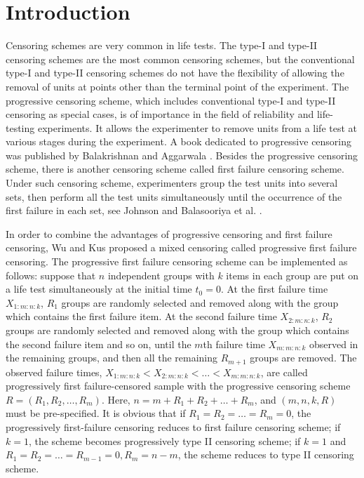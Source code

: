 \documentclass[12pt]{article}
\begin{document}
\section{Introduction}
Censoring schemes are very common in life tests. The type-I and type-II censoring schemes are the most common censoring schemes, but the conventional type-I and type-II censoring schemes do not have the flexibility of allowing the removal of units at points other than the terminal point of the experiment. The progressive censoring scheme, which includes conventional type-I and type-II censoring as special cases, is of importance in the field of reliability and life-testing experiments. It allows the experimenter to remove units from a life test at various stages during the experiment. A book dedicated to progressive censoring was published by Balakrishnan and Aggarwala \cite{balakrishnan2000progressive}. Besides the progressive censoring scheme, there is another censoring scheme called first failure censoring scheme. Under such censoring scheme, experimenters group the test units into several sets, then perform all the test units simultaneously until the occurrence of the first failure in each set, see Johnson \cite{ johnson1964theory} and Balasooriya et al. \cite{ balasooriya2000progressively}.

In order to combine the advantages of progressive censoring and first failure censoring, Wu and Kus \cite{wu2009estimation} proposed a mixed censoring called progressive first failure censoring. The progressive first failure censoring scheme can be implemented as follows: suppose that $n$ independent groups with $k$ items in each group are put on a life test simultaneously at the initial time $t_0 = 0$. At the first failure time $X_{1:m:n:k}$, $R_1$ groups are randomly selected and removed along with the group which contains the first failure item. At the second failure time $X_{2:m:n:k}$, $R_2$ groups are randomly selected and removed along with the group which contains the second failure item and so on, until the $m$th failure time $X_{m:m:n:k}$ observed in the remaining groups, and then all the remaining $R_{m + 1}$ groups are removed. The observed failure times, $X_{1:m:n:k} < X_{2:m:n:k} <\dots< X_{m:m:n:k}$, are called progressively first failure-censored sample with the progressive censoring scheme $R = (R_1,R_2,\dots, R_m)$. Here, $n = m + R_1 + R_2 +\dots+R_m$, and $(m, n, k, R)$ must be pre-specified. It is obvious that if $R_1=R_2=\ldots=R_m=0$, the progressively first-failure censoring reduces to first failure censoring scheme; if $k=1$, the scheme becomes progressively type II censoring scheme; if $k=1$ and $R_1=R_2=\ldots =R_{m-1}=0,R_m=n-m$, the scheme reduces to type II censoring scheme.
\end{document}
